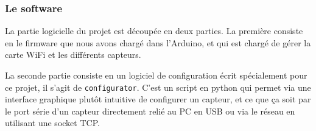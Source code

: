 		\subsubsection{Le software}
		La partie logicielle du projet est découpée en deux parties. La première
		consiste en le firmware que nous avons chargé dans l'Arduino, et qui est chargé
		de gérer la carte WiFi et les différents capteurs.
		\par
		La seconde partie consiste en un logiciel de configuration écrit spécialement
		pour ce projet, il s'agit de \texttt{configurator}. C'est un script en python
		qui permet via une interface graphique plutôt intuitive de configurer un capteur,
		et ce que ça soit par le port série d'un capteur directement relié au PC en USB
		ou via le réseau en utilisant une socket TCP.
